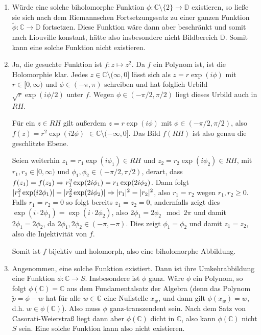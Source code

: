 \documentclass[a4paper]{article}
\begin{document}
\begin{enumerate}
    \item Würde eine solche biholomorphe Funktion $\phi: \mathds{C} \setminus \{2\} \to \mathds{D}$ existieren, so ließe sie sich nach dem Riemannschen Fortsetzungssatz zu einer ganzen Funktion $\tilde{\phi}: \mathds{C} \to \mathds{D}$ fortsetzen.
    Diese Funktion wäre dann aber beschränkt und somit nach Liouville konstant, hätte also insbesondere nicht Bildbereich $\mathds{D}$.
    Somit kann eine solche Funktion nicht existieren.
    \item Ja, die gesuchte Funktion ist $f: z \mapsto z^2$.
    Da $f$ ein Polynom ist, ist die Holomorphie klar.
    Jedes $z \in \mathds{C} \setminus (\infty, 0]$ lässt sich als $z = r \exp(i \phi)$ mit $r \in [0, \infty)$ und $\phi \in (-\pi, \pi)$ schreiben und hat folglich Urbild $\sqrt{r} \exp(i \phi/2)$ unter $f$.
    Wegen $\phi \in (-\pi/2, \pi/2)$ liegt dieses Urbild auch in $RH$.

    Für ein $z \in RH$ gilt außerdem $z = r \exp(i \phi)$ mit $\phi \in (- \pi/2, \pi/2)$, also $f(z) = r^2 \exp(i 2\phi)$ $\in \mathds{C} \setminus (-\infty, 0]$.
    Das Bild $f(RH)$ ist also genau die geschlitzte Ebene.

    Seien weiterhin $z_1 = r_1 \exp(i \phi_1) \in RH$ und $z_2 = r_2 \exp(i \phi_2) \in RH$, mit $r_1, r_2 \in [0, \infty)$ und $\phi_1, \phi_2 \in (-\pi/2, \pi/2)$, derart, dass $f(z_1) = f(z_2) \then r_1^2 \exp(2i \phi_1) = r_1 \exp(2i \phi_2)$.
    Dann folgt $|r_1^2 \exp(i 2 \phi_1)| = |r_2^2 \exp(2i \phi_2)| \then |r_1|^2 = |r_2|^2$, also $r_1 = r_2$ wegen $r_1, r_2 \geq 0$.
    Falls $r_1 = r_2 = 0$ so folgt bereits $z_1 = z_2 = 0$, andernfalls zeigt dies $\exp(i \cdot 2 \phi_1) = \exp(i \cdot 2 \phi_2)$, also $2 \phi_1 = 2\phi_2 \mod 2\pi$ und damit $2 \phi_1 = 2 \phi_2$, da $2 \phi_1, 2 \phi_2 \in (- \pi, -\pi)$.
    Dies zeigt $\phi_1 = \phi_2$ und damit $z_1 = z_2$, also die Injektivität von $f$.

    Somit ist $f$ bijektiv und holomorph, also eine biholomorphe Abbildung.

    \item Angenommen, eine solche Funktion existiert.
    Dann ist ihre Umkehrabbildung eine Funktion $\phi: \mathds{C} \to S$.
    Insbesondere ist $\phi$ ganz.
    Wäre $\phi$ ein Polynom, so folgt $\phi(\mathds{C}) = \mathds{C}$ aus dem Fundamentalsatz der Algebra (denn das Polynom $\tilde{p} = \phi - w$ hat für alle $w \in \mathds{C}$ eine Nullstelle $x_w$, und dann gilt $\phi(x_w) = w$, d.h. $w \in \phi(\mathds{C})$).
    Also muss $\phi$ ganz-transzendent sein.
    Nach dem Satz von Casorati-Weierstraß liegt dann aber $\phi(\mathds{C})$ dicht in $\mathds{C}$, also kann $\phi(\mathds{C})$ nicht $S$ sein.
    Eine solche Funktion kann also nicht existieren.
\end{enumerate}
\end{document}
